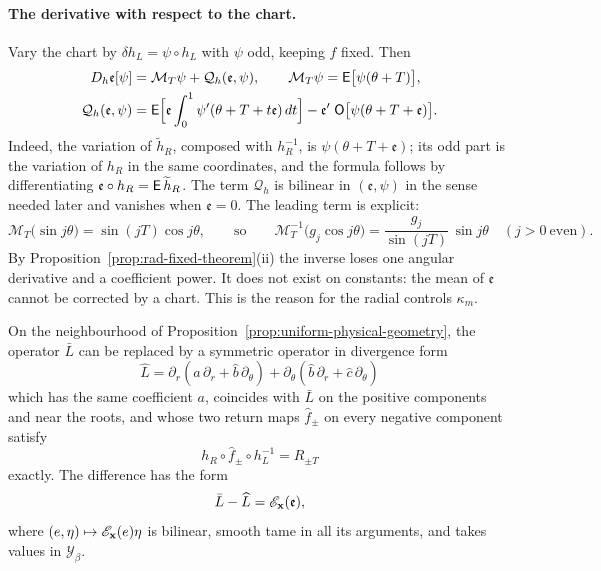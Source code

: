 \paragraph{The derivative with respect to the chart.}
Vary the chart by $\delta h_L=\psi\circ h_L$ with $\psi$ odd, keeping
$f$ fixed. Then
\begin{equation}\label{eq:full-height-chart-derivative}
 \begin{split}
 D_h\mathfrak e[\psi]&=\mathcal M_T\psi+\mathcal Q_h(\mathfrak e,\psi),\qquad
 \mathcal M_T\psi=\mathsf E\bigl[\psi(\theta+T)\bigr],\\
 \mathcal Q_h(\mathfrak e,\psi)&=
 \mathsf E\Bigl[\mathfrak e\int_0^1
       \psi'(\theta+T+t\mathfrak e)\,dt\Bigr]
 -\mathfrak e'\;\mathsf O\bigl[\psi(\theta+T+\mathfrak e)\bigr].
 \end{split}
\end{equation}
Indeed, the variation of $\widetilde h_R$, composed with $h_R^{-1}$,
is $\psi(\theta+T+\mathfrak e)$; its odd part is the variation of
$h_R$ in the same coordinates, and the formula follows by
differentiating $\mathfrak e\circ h_R=\mathsf E\,\widetilde h_R$. The
term $\mathcal Q_h$ is bilinear in $(\mathfrak e,\psi)$ in the sense
needed later and vanishes when $\mathfrak e=0$. The leading term is
explicit:
\begin{equation}\label{eq:rewrite-circle-inverse}
 \mathcal M_T\bigl(\sin j\theta\bigr)=\sin(jT)\cos j\theta,
 \qquad\text{so}\qquad
 \mathcal M_T^{-1}\bigl(g_j\cos j\theta\bigr)
       =\frac{g_j}{\sin(jT)}\,\sin j\theta
 \quad(j>0\ \text{even}).
\end{equation}
By Proposition~\ref{prop:rad-fixed-theorem}(ii) the inverse loses one
angular derivative and a coefficient power. It does not exist on
constants: the mean of $\mathfrak e$ cannot be corrected by a chart.
This is the reason for the radial controls $\kappa_m$.

\begin{proposition}
\label{prop:optical-residual-completion}
On the neighbourhood of
Proposition~\ref{prop:uniform-physical-geometry}, the operator
$\bar L$ can be replaced by a symmetric operator in divergence form
\[
 \widehat L=\partial_r(a\,\partial_r+\widehat b\,\partial_\theta)
           +\partial_\theta(\widehat b\,\partial_r
                            +\widehat c\,\partial_\theta)
\]
which has the same coefficient $a$, coincides with $\bar L$ on the
positive components and near the roots, and whose two return maps
$\widehat f_\pm$ on every negative component satisfy
\[
 h_R\circ\widehat f_\pm\circ h_L^{-1}=R_{\pm T}
\]
exactly. The difference has the form
\begin{equation}\label{eq:optical-residual-completion}
 \bar L-\widehat L=\mathscr E_{\mathbf x}(\mathfrak e),
\end{equation}
where $(e,\eta)\mapsto\mathscr E_{\mathbf x}(e)\eta$ is bilinear, smooth
tame in all its arguments, and takes values in $\mathcal Y_\beta$.
\end{proposition}

